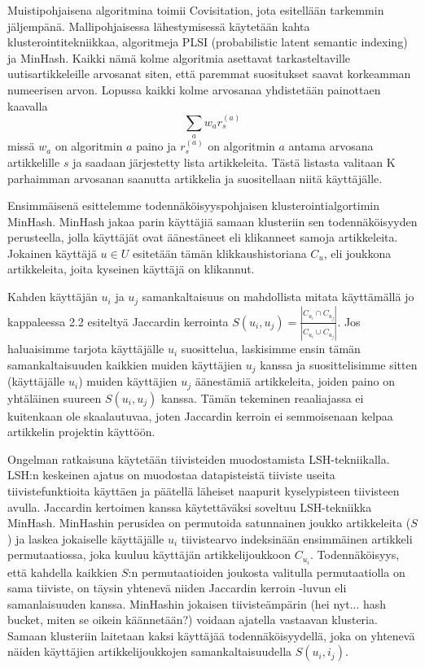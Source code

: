 \documentclass[12pt,finnish]{tktltiki2}
\theoremstyle{definition}
\theoremstyle{remark}
\begin{document}
Muistipohjaisena algoritmina toimii Covisitation, jota esitellään tarkemmin jäljempänä. Mallipohjaisessa lähestymisessä käytetään kahta klusterointitekniikkaa, algoritmeja PLSI (probabilistic latent semantic indexing) ja MinHash. Kaikki nämä kolme algoritmia asettavat tarkasteltaville uutisartikkeleille arvosanat siten, että paremmat suositukset saavat korkeamman numeerisen arvon. Lopussa kaikki kolme arvosanaa yhdistetään painottaen kaavalla
\begin{displaymath}
\sum_a{w_a r^{(a)}_{s}}
\end{displaymath}
missä $w_a$ on algoritmin $a$ paino ja $r^{(a)}_{s}$ on algoritmin $a$ antama arvosana artikkelille $s$ ja saadaan järjestetty lista artikkeleita. Tästä listasta valitaan K parhaimman arvosanan saanutta artikkelia ja suositellaan niitä käyttäjälle.

Ensimmäisenä esittelemme todennäköisyyspohjaisen klusterointialgortimin MinHash. MinHash jakaa parin käyttäjiä samaan klusteriin sen todennäköisyyden perusteella, jolla käyttäjät ovat äänestäneet eli klikanneet samoja artikkeleita. Jokainen käyttäjä $u \in U$ esitetään tämän klikkaushistoriana $C_u$, eli joukkona artikkeleita, joita kyseinen käyttäjä on klikannut.

Kahden käyttäjän $u_i$ ja $u_j$ samankaltaisuus on mahdollista mitata käyttämällä jo kappaleessa 2.2 esiteltyä Jaccardin kerrointa $S(u_i, u_j) = \frac{|C_{u_{i}} \cap C_{u_{j}}|}{|C_{u_{i}} \cup C_{u_{j}}|}$. Jos haluaisimme tarjota käyttäjälle $u_i$ suosittelua, laskisimme ensin tämän samankaltaisuuden kaikkien muiden käyttäjien $u_j$ kanssa ja suosittelisimme sitten (käyttäjälle $u_i$) muiden käyttäjien $u_j$ äänestämiä artikkeleita, joiden paino on yhtäläinen suureen $S(u_i, u_j)$ kanssa. Tämän tekeminen reaaliajassa ei kuitenkaan ole skaalautuvaa, joten Jaccardin kerroin ei semmoisenaan kelpaa artikkelin projektin käyttöön.

Ongelman ratkaisuna käytetään tiivisteiden muodostamista LSH-tekniikalla. LSH:n keskeinen ajatus on muodostaa datapisteistä tiiviste useita tiivistefunktioita käyttäen ja päätellä läheiset naapurit kyselypisteen tiivisteen avulla. Jaccardin kertoimen kanssa käytettäväksi soveltuu LSH-tekniikka MinHash. MinHashin perusidea on permutoida satunnainen joukko artikkeleita ($S$) ja laskea jokaiselle käyttäjälle $u_i$ tiivistearvo indeksinään ensimmäinen artikkeli permutaatiossa, joka kuuluu käyttäjän artikkelijoukkoon $C_{u_{i}}$. Todennäköisyys, että kahdella kaikkien $S$:n permutaatioiden joukosta valitulla permutaatiolla on sama tiiviste, on täysin yhtenevä  niiden Jaccardin kerroin -luvun eli samanlaisuuden kanssa. MinHashin jokaisen tiivisteämpärin (hei nyt... hash bucket, miten se oikein käännetään?) voidaan ajatella vastaavan klusteria. Samaan klusteriin laitetaan kaksi käyttäjää todennäköisyydellä, joka on yhtenevä näiden käyttäjien artikkelijoukkojen samankaltaisuudella $S(u_i, i_j)$.
\end{document}
